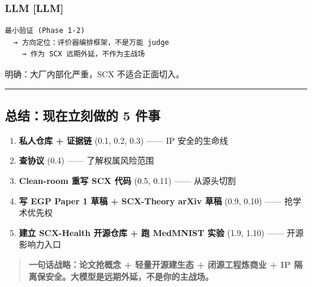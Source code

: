 \documentclass[
  12pt,
]{ctexart}
\providecommand{\tightlist}{%
  \setlength{\itemsep}{0pt}\setlength{\parskip}{0pt}}
\begin{document}
\subsubsection{LLM {[}LLM{]}}\label{llm-llm}

\begin{verbatim}
最小验证 (Phase 1-2)
  → 方向定位：评价器编排框架，不是万能 judge
    → 作为 SCX 远期外延，不作为主战场
\end{verbatim}

明确：大厂内部化严重，SCX 不适合正面切入。

\begin{center}\rule{0.5\linewidth}{0.5pt}\end{center}

\subsection{总结：现在立刻做的 5
件事}\label{ux603bux7ed3ux73b0ux5728ux7acbux523bux505aux7684-5-ux4ef6ux4e8b}

\begin{enumerate}
\def\labelenumi{\arabic{enumi}.}
\tightlist
\item
  \textbf{私人仓库 + 证据链} (0.1, 0.2, 0.3) ------ IP 安全的生命线
\item
  \textbf{查协议} (0.4) ------ 了解权属风险范围
\item
  \textbf{Clean-room 重写 SCX 代码} (0.5, 0.11) ------ 从源头切割
\item
  \textbf{写 EGP Paper 1 草稿 + SCX-Theory arXiv 草稿} (0.9, 0.10)
  ------ 抢学术优先权
\item
  \textbf{建立 SCX-Health 开源仓库 + 跑 MedMNIST 实验} (1.9, 1.10)
  ------ 开源影响力入口
\end{enumerate}

\begin{quote}
\textbf{一句话战略：论文抢概念 + 轻量开源建生态 + 闭源工程炼商业 + IP
隔离保安全。大模型是远期外延，不是你的主战场。}
\end{quote}
\end{document}
